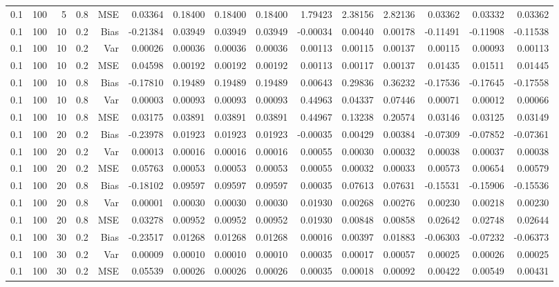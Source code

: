 \begin{table}[!htbp]
\begin{tabular}{lrrrrrrrrrrrrrr}
0.1 & 100 &  5 & 0.8 & MSE & 0.03364 & 0.18400 & 0.18400 & 0.18400 & 1.79423 & 2.38156 & 2.82136 & 0.03362 & 0.03332 & 0.03362 \\
0.1 & 100 & 10 & 0.2 & Bias & -0.21384 & 0.03949 & 0.03949 & 0.03949 & -0.00034 & 0.00440 & 0.00178 & -0.11491 & -0.11908 & -0.11538 \\
0.1 & 100 & 10 & 0.2 & Var & 0.00026 & 0.00036 & 0.00036 & 0.00036 & 0.00113 & 0.00115 & 0.00137 & 0.00115 & 0.00093 & 0.00113 \\
0.1 & 100 & 10 & 0.2 & MSE & 0.04598 & 0.00192 & 0.00192 & 0.00192 & 0.00113 & 0.00117 & 0.00137 & 0.01435 & 0.01511 & 0.01445 \\
0.1 & 100 & 10 & 0.8 & Bias & -0.17810 & 0.19489 & 0.19489 & 0.19489 & 0.00643 & 0.29836 & 0.36232 & -0.17536 & -0.17645 & -0.17558 \\
0.1 & 100 & 10 & 0.8 & Var & 0.00003 & 0.00093 & 0.00093 & 0.00093 & 0.44963 & 0.04337 & 0.07446 & 0.00071 & 0.00012 & 0.00066 \\
0.1 & 100 & 10 & 0.8 & MSE & 0.03175 & 0.03891 & 0.03891 & 0.03891 & 0.44967 & 0.13238 & 0.20574 & 0.03146 & 0.03125 & 0.03149 \\
0.1 & 100 & 20 & 0.2 & Bias & -0.23978 & 0.01923 & 0.01923 & 0.01923 & -0.00035 & 0.00429 & 0.00384 & -0.07309 & -0.07852 & -0.07361 \\
0.1 & 100 & 20 & 0.2 & Var & 0.00013 & 0.00016 & 0.00016 & 0.00016 & 0.00055 & 0.00030 & 0.00032 & 0.00038 & 0.00037 & 0.00038 \\
0.1 & 100 & 20 & 0.2 & MSE & 0.05763 & 0.00053 & 0.00053 & 0.00053 & 0.00055 & 0.00032 & 0.00033 & 0.00573 & 0.00654 & 0.00579 \\
0.1 & 100 & 20 & 0.8 & Bias & -0.18102 & 0.09597 & 0.09597 & 0.09597 & 0.00035 & 0.07613 & 0.07631 & -0.15531 & -0.15906 & -0.15536 \\
0.1 & 100 & 20 & 0.8 & Var & 0.00001 & 0.00030 & 0.00030 & 0.00030 & 0.01930 & 0.00268 & 0.00276 & 0.00230 & 0.00218 & 0.00230 \\
0.1 & 100 & 20 & 0.8 & MSE & 0.03278 & 0.00952 & 0.00952 & 0.00952 & 0.01930 & 0.00848 & 0.00858 & 0.02642 & 0.02748 & 0.02644 \\
0.1 & 100 & 30 & 0.2 & Bias & -0.23517 & 0.01268 & 0.01268 & 0.01268 & 0.00016 & 0.00397 & 0.01883 & -0.06303 & -0.07232 & -0.06373 \\
0.1 & 100 & 30 & 0.2 & Var & 0.00009 & 0.00010 & 0.00010 & 0.00010 & 0.00035 & 0.00017 & 0.00057 & 0.00025 & 0.00026 & 0.00025 \\
0.1 & 100 & 30 & 0.2 & MSE & 0.05539 & 0.00026 & 0.00026 & 0.00026 & 0.00035 & 0.00018 & 0.00092 & 0.00422 & 0.00549 & 0.00431 \\

\end{tabular}
\end{table}

